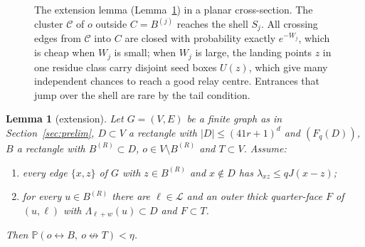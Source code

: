 \documentclass[11pt]{article}
\newtheorem{lemma}[theorem]{Lemma}
\theoremstyle{definition}
\theoremstyle{remark}
\numberwithin{equation}{section}
\newcommand{\Pp}{\mathbb P}
\newcommand{\1}{\mathbf 1}
\newcommand{\cL}{\mathcal L}
\newcommand{\lr}{\leftrightarrow}
\newcommand{\nlr}{\mathrel{\not\leftrightarrow}}
\newcommand{\Lam}{\Lambda}
\begin{document}
\begin{figure}[tp]
\caption{The extension lemma (Lemma~\ref{lem:extension}) in a planar cross-section. The cluster
$\mathcal C$ of $o$ outside $C=B^{(j)}$ reaches the shell $S_j$. All crossing edges from
$\mathcal C$ into $C$ are closed with probability exactly $e^{-W_j}$, which is cheap when $W_j$ is
small; when $W_j$ is large, the landing points $z$ in one residue class carry disjoint seed boxes
$U(z)$, which give many independent chances to reach a good relay centre. Entrances that jump over
the shell are rare by the tail condition.}
\label{fig:extension}
\end{figure}

\begin{lemma}[extension]\label{lem:extension}
Let $G=(V,E)$ be a finite graph as in Section~\ref{sec:prelim}, $D\subset V$ a rectangle with
$|D|\le(41r+1)^d$ and $(F_q(D))$, $B$ a rectangle with $B^{(R)}\subset D$, $o\in V\setminus B^{(R)}$
and $T\subset V$. Assume:
\begin{enumerate}
\item[(E2)] every edge $\{x,z\}$ of $G$ with $z\in B^{(R)}$ and $x\notin D$ has $\lambda_{xz}\le qJ(x-z)$;
\item[(E3)] for every $u\in B^{(R)}$ there are $\ell\in\cL$ and an outer thick quarter-face $F$ of $(u,\ell)$
with $\Lam_{\ell+w}(u)\subset D$ and $F\subset T$.
\end{enumerate}
Then $\Pp(o\lr B,\ o\nlr T)<\eta$.
\end{lemma}
\end{document}
